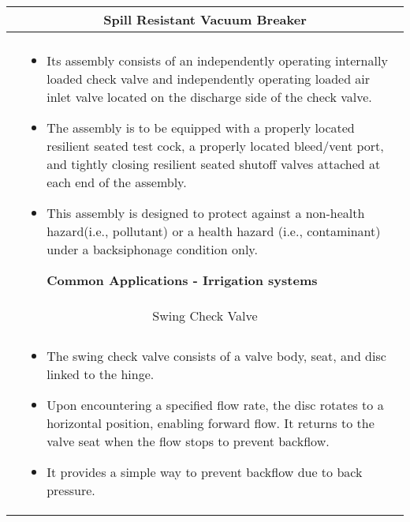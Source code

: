 \begin{landscape}
\begin{table}[h!]
\begin{tabular}{|c m{20cm} |}
    \\ \hline
\multicolumn{2}{c}{Spill Resistant Vacuum Breaker} \index{Backflow!Prevention devices!Spill resistant vacuum breaker}\\ \hline
    \begin{minipage}{.3\textwidth}
     \texttt{[image: SpillResitantVacuumBreaker1]}\\
    \end{minipage}
     &
    \vspace{0.4cm}
 \scriptsize{\begin{itemize}[topsep=5pt, partopsep=0pt]
\item Its assembly consists of an independently operating internally loaded check valve and independently operating loaded air inlet valve located on the discharge side of the check valve. 
\item The assembly is to be equipped with a properly located resilient seated test cock, a properly located bleed/vent port, and tightly closing resilient seated shutoff valves attached at each end of the assembly. 
\item This assembly is designed to protect against a non-health hazard(i.e., pollutant) or a health hazard (i.e., contaminant) under a backsiphonage condition only.

\textbf{Common Applications - Irrigation systems}
\end{itemize}}
\\ \hline

\multicolumn{2}{c}{Swing Check Valve} \index{Backflow!Prevention devices!Swing check valve}\\ \hline
    \begin{minipage}{.3\textwidth}
     \texttt{[image: SwingCheckValve1]}\\
    \end{minipage}
     &
    \vspace{0.4cm}
 \scriptsize{\begin{itemize}[topsep=5pt, partopsep=0pt]
\item The swing check valve consists of a valve body, seat, and disc linked to the hinge. 
\item Upon encountering a specified flow rate, the disc rotates to a horizontal position, enabling forward flow. It returns to the valve seat when the flow stops to prevent backflow. 
\item It provides a simple way to prevent backflow due to back pressure.


\end{itemize}}
\end{tabular}
\end{table}
\end{landscape}
